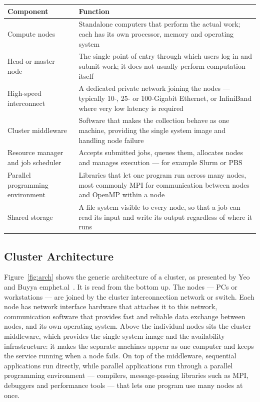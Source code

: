 \begin{center}
\begin{tabularx}{\textwidth}{@{}p{4.2cm}L@{}}
\toprule
\textbf{Component} & \textbf{Function} \\
\midrule
Compute nodes & Standalone computers that perform the actual work; each has
  its own processor, memory and operating system \\
Head or master node & The single point of entry through which users log in
  and submit work; it does not usually perform computation itself \\
High-speed interconnect & A dedicated private network joining the nodes ---
  typically 10-, 25- or 100-Gigabit Ethernet, or InfiniBand where very low
  latency is required \\
Cluster middleware & Software that makes the collection behave as one
  machine, providing the single system image and handling node failure \\
Resource manager and job scheduler & Accepts submitted jobs, queues them,
  allocates nodes and manages execution --- for example Slurm or PBS \\
Parallel programming environment & Libraries that let one program run across
  many nodes, most commonly MPI for communication between nodes and OpenMP
  within a node \\
Shared storage & A file system visible to every node, so that a job can read
  its input and write its output regardless of where it runs \\
\bottomrule
\end{tabularx}
\end{center}

\subsection{Cluster Architecture}

Figure~\ref{fig:arch} shows the generic architecture of a cluster, as
presented by Yeo and Buyya emph{et.al}~. It is read from the
bottom up. The
nodes --- PCs or workstations --- are joined by the cluster interconnection
network or switch. Each node has network interface hardware that attaches it
to this network, communication software that provides fast and reliable data
exchange between nodes, and its own operating system. Above the individual
nodes sits the cluster middleware, which provides the single system image and
the availability infrastructure: it makes the separate machines appear as one
computer and keeps the service running when a node fails. On top of the
middleware, sequential applications run directly, while parallel applications
run through a parallel programming environment --- compilers, message-passing
libraries such as MPI, debuggers and performance tools --- that lets one
program use many nodes at once.

